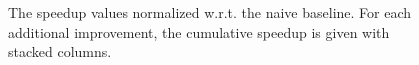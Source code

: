 \documentclass[12pt]{article}
\begin{document}
\begin{figure}[ht]
	\centering
	\caption{The speedup values normalized w.r.t. the naive baseline. For each additional improvement, the cumulative speedup is given with stacked columns.}
	\label{fig:speedups}
\end{figure}
\end{document}
